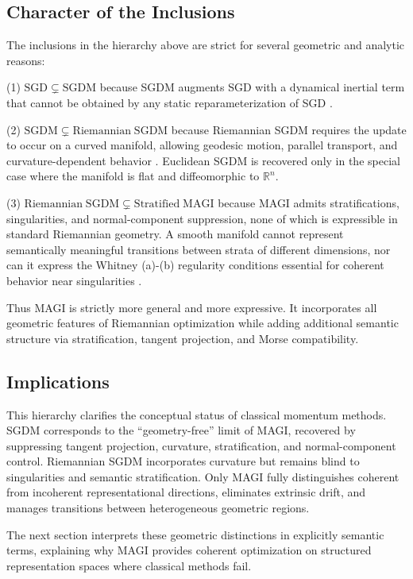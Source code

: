 \documentclass[12pt]{article}
\begin{document}
\subsection*{Character of the Inclusions}

The inclusions in the hierarchy above are strict for several geometric and analytic reasons:

(1) $\mathrm{SGD} \subsetneq \mathrm{SGDM}$ because SGDM augments SGD with a dynamical inertial term that cannot be obtained by any static reparameterization of SGD \citep{Polyak1964,Wibisono2016}.

(2) $\mathrm{SGDM} \subsetneq \mathrm{Riemannian\;SGDM}$ because Riemannian SGDM requires the update to occur on a curved manifold, allowing geodesic motion, parallel transport, and curvature-dependent behavior \citep{Absil2008}. Euclidean SGDM is recovered only in the special case where the manifold is flat and diffeomorphic to $\mathbb{R}^n$.

(3) $\mathrm{Riemannian\;SGDM} \subsetneq \mathrm{Stratified\;MAGI}$ because MAGI admits stratifications, singularities, and normal-component suppression, none of which is expressible in standard Riemannian geometry. A smooth manifold cannot represent semantically meaningful transitions between strata of different dimensions, nor can it express the Whitney (a)-(b) regularity conditions essential for coherent behavior near singularities \citep{Whitney1965,Pflaum2000}.

Thus MAGI is strictly more general and more expressive. It incorporates all geometric features of Riemannian optimization while adding additional semantic structure via stratification, tangent projection, and Morse compatibility.

\subsection*{Implications}

This hierarchy clarifies the conceptual status of classical momentum methods. SGDM corresponds to the “geometry-free” limit of MAGI, recovered by suppressing tangent projection, curvature, stratification, and normal-component control. Riemannian SGDM incorporates curvature but remains blind to singularities and semantic stratification. Only MAGI fully distinguishes coherent from incoherent representational directions, eliminates extrinsic drift, and manages transitions between heterogeneous geometric regions.

The next section interprets these geometric distinctions in explicitly semantic terms, explaining why MAGI provides coherent optimization on structured representation spaces where classical methods fail.
\end{document}
